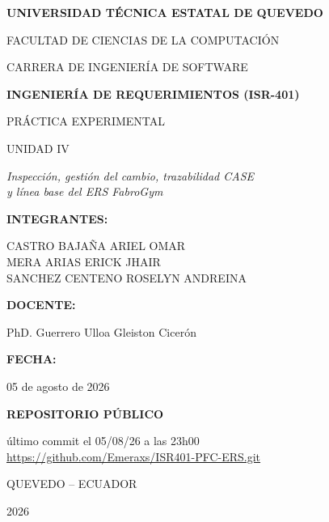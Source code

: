\documentclass[11pt,a4paper]{article}
\begin{document}
\begin{titlepage}
\centering

{\large\bfseries UNIVERSIDAD TÉCNICA ESTATAL DE QUEVEDO\par}
\vspace{0.3cm}
{\large FACULTAD DE CIENCIAS DE LA COMPUTACIÓN\par}
\vspace{0.2cm}
{\large CARRERA DE INGENIERÍA DE SOFTWARE\par}

\vspace{2cm}
{\Large\bfseries INGENIERÍA DE REQUERIMIENTOS (ISR-401)\par}
\vspace{0.5cm}
{\large PRÁCTICA EXPERIMENTAL\par}
{\large UNIDAD IV\par}

\vspace{1cm}
{\large\itshape Inspección, gestión del cambio, trazabilidad CASE\\
y línea base del ERS FabroGym\par}

\vspace{2cm}
{\bfseries INTEGRANTES:\par}
\vspace{0.3cm}
CASTRO BAJAÑA ARIEL OMAR\\
MERA ARIAS ERICK JHAIR\\
SANCHEZ CENTENO ROSELYN ANDREINA

\vspace{1.5cm}
{\bfseries DOCENTE:\par}
\vspace{0.3cm}
PhD. Guerrero Ulloa Gleiston Cicerón

\vspace{1.5cm}
{\bfseries FECHA:\par}
\vspace{0.3cm}
05 de agosto de 2026

\vspace{2cm}
{\bfseries REPOSITORIO PÚBLICO\par}
\vspace{0.3cm}
último commit el 05/08/26 a las 23h00\\
\url{https://github.com/Emeraxs/ISR401-PFC-ERS.git}

\vfill

{\large QUEVEDO -- ECUADOR\par}
{\large 2026\par}

\end{titlepage}
\end{document}
